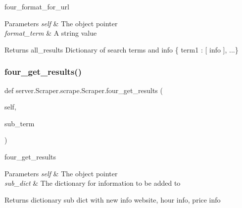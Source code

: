 four\+\_\+format\+\_\+for\+\_\+url 
\begin{DoxyParams}{Parameters}
{\em self} & The object pointer \\
\hline
{\em format\+\_\+term} & A string value \\
\hline
\end{DoxyParams}
\begin{DoxyReturn}{Returns}
all\+\_\+results Dictionary of search terms and info \{ term1 \+: \mbox{[} info \mbox{]}, ...\} 
\end{DoxyReturn}
\mbox{\label{classserver_1_1_scraper_1_1scrape_1_1_scraper_a783cc9e70f79b362d03b9d93d1d587ef}} 
\subsubsection{\texorpdfstring{four\+\_\+get\+\_\+results()}{four\_get\_results()}}
{\footnotesize\ttfamily def server.\+Scraper.\+scrape.\+Scraper.\+four\+\_\+get\+\_\+results (\begin{DoxyParamCaption}\item[{}]{self,  }\item[{}]{sub\+\_\+term }\end{DoxyParamCaption})}





four\+\_\+get\+\_\+results 
\begin{DoxyParams}{Parameters}
{\em self} & The object pointer \\
\hline
{\em sub\+\_\+dict} & The dictionary for information to be added to \\
\hline
\end{DoxyParams}
\begin{DoxyReturn}{Returns}
dictionary sub dict with new info website, hour info, price info 
\end{DoxyReturn}
\mbox{\label{classserver_1_1_scraper_1_1scrape_1_1_scraper_a1145a663a9763ba00b24b784381fa1df}} 
